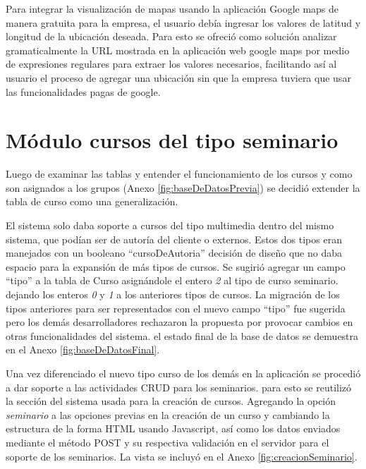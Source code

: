 	Para integrar la visualización de mapas usando la aplicación Google maps de manera gratuita para la empresa, el usuario debía ingresar los valores de latitud y longitud de la ubicación deseada. Para esto se ofreció como solución analizar gramaticalmente la \gls{URL} mostrada en la aplicación web google maps por medio de expresiones regulares para extraer los valores necesarios, facilitando así al usuario el proceso de agregar una ubicación sin que la empresa tuviera que usar las funcionalidades pagas de google.


	\section{Módulo cursos del tipo seminario} %
	\label{sec:cursos_del_tipo_seminario}
	
	Luego de examinar las tablas y entender el funcionamiento de los cursos y como son asignados a los grupos (Anexo \ref{fig:baseDeDatosPrevia}) se decidió extender la tabla de curso como una generalización.

	El sistema solo daba soporte a cursos del tipo multimedia dentro del mismo sistema, que podían ser de autoría del cliente o externos. Estos dos tipos eran manejados con un booleano ``cursoDeAutoria'' decisión de diseño que no daba espacio para la expansión de más tipos de cursos. Se sugirió agregar un campo ``tipo'' a la tabla de Curso asignándole el entero \emph{2} al tipo de curso seminario. dejando los enteros \emph{0} y \emph{1} a los anteriores tipos de cursos. La migración de los tipos anteriores para ser representados con el nuevo campo ``tipo'' fue sugerida pero los demás desarrolladores rechazaron la propuesta por provocar cambios en otras funcionalidades del sistema. el estado final de la base de datos se demuestra en el Anexo \ref{fig:baseDeDatosFinal}.

	Una vez diferenciado el nuevo tipo curso de los demás en la aplicación se procedió a dar soporte a las actividades \gls{CRUD} para los seminarios. para esto se reutilizó la sección del sistema usada para la creación de cursos. Agregando la opción \emph{seminario} a las opciones previas en la creación de un curso y cambiando la estructura de la forma \gls{HTML} usando Javascript, así como los datos enviados mediante el método POST y su respectiva validación en el servidor para el soporte de los seminarios. La vista se incluyó en el Anexo \ref{fig:creacionSeminario}.

